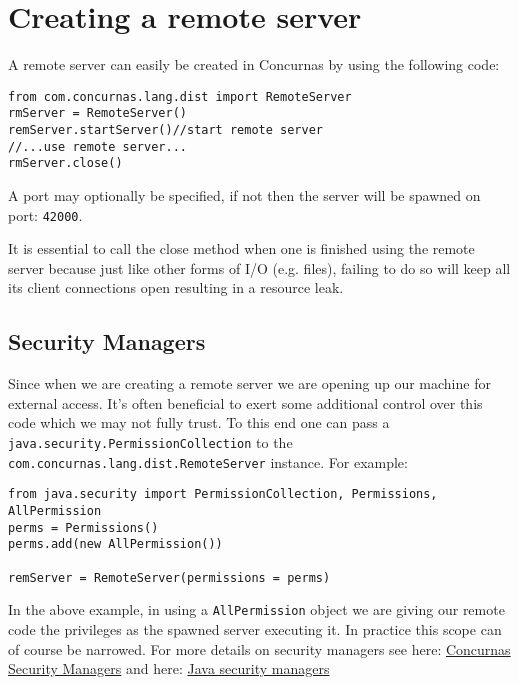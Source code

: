 \documentclass[conc-doc]{subfiles}
\begin{document}
\section{Creating a remote server}	
A remote server can easily be created in Concurnas by using the following code:
\begin{lstlisting}
from com.concurnas.lang.dist import RemoteServer
rmServer = RemoteServer()
remServer.startServer()//start remote server
//...use remote server...
rmServer.close()
\end{lstlisting}

A port may optionally be specified, if not then the server will be spawned on port: \lstinline{42000}.

It is essential to call the close method when one is finished using the remote server because just like other forms of I/O (e.g. files), failing to do so will keep all its client connections open resulting in a resource leak.

\subsection{Security Managers}
\begin{sloppypar}
Since when we are creating a remote server we are opening up our machine for external access. It's often beneficial to exert some additional control over this code which we may not fully trust. To this end one can pass a \lstinline{java.security.PermissionCollection} to the \lstinline{com.concurnas.lang.dist.RemoteServer} instance. For example:
\end{sloppypar}

\begin{lstlisting}
from java.security import PermissionCollection, Permissions, AllPermission
perms = Permissions()
perms.add(new AllPermission())

remServer = RemoteServer(permissions = perms)
\end{lstlisting}

\begin{sloppypar}
In the above example, in using a \lstinline{AllPermission} object we are giving our remote code the privileges as the spawned server executing it. In practice this scope can of course be narrowed. For more details on security managers see here: \hyperref[sec:Security Managers]{Concurnas Security Managers} and here: \href{https://docs.oracle.com/javase/8/docs/technotes/guides/security/spec/security-spec.doc3.html}{Java security managers}
\end{sloppypar}
\end{document}
